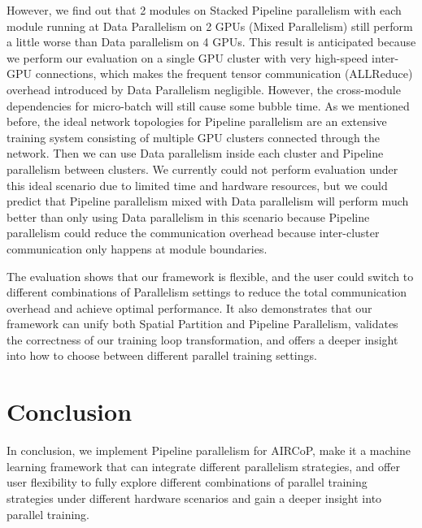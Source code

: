 \documentclass[sigplan, nonacm]{acmart}\settopmatter{printfolios=true,printccs=false,printacmref=false}
\begin{document}
 However, we find out that 2 modules on Stacked Pipeline parallelism with each module running at Data Parallelism on 2 GPUs (Mixed Parallelism) still perform a little worse than Data parallelism on 4 GPUs. This result is anticipated because we perform our evaluation on a single GPU cluster with very high-speed inter-GPU connections, which makes the frequent tensor communication (ALLReduce) overhead introduced by Data Parallelism negligible. However, the cross-module dependencies for micro-batch will still cause some bubble time. As we mentioned before, the ideal network topologies for Pipeline parallelism are an extensive training system consisting of multiple GPU clusters connected through the network. Then we can use Data parallelism inside each cluster and Pipeline parallelism between clusters. We currently could not perform evaluation under this ideal scenario due to limited time and hardware resources, but we could predict that Pipeline parallelism mixed with Data parallelism will perform much better than only using Data parallelism in this scenario because Pipeline parallelism could reduce the communication overhead because inter-cluster communication only happens at module boundaries.\par
 The evaluation shows that our framework is flexible, and the user could switch to different combinations of Parallelism settings to reduce the total communication overhead and achieve optimal performance. It also demonstrates that our framework can unify both Spatial Partition and Pipeline Parallelism, validates the correctness of our training loop transformation, and offers a deeper insight into how to choose between different parallel training settings.
 \section{Conclusion} \label{conclusion}
In conclusion, we implement Pipeline parallelism for AIRCoP, make it a machine learning framework that can integrate different parallelism strategies, and offer user flexibility to fully explore different combinations of parallel training strategies under different hardware scenarios and gain a deeper insight into parallel training.


\end{document}
